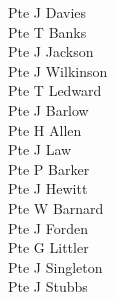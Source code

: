 \begin{multicols}{3}
  Pte J Davies \\
  Pte T Banks \\
  Pte J Jackson \\
  Pte J Wilkinson \\
  Pte T Ledward \\
  Pte J Barlow \\
  Pte H Allen \\
  Pte J Law \\
  Pte P Barker \\
  Pte J Hewitt \\
  Pte W Barnard \\
  Pte J Forden \\
  Pte G Littler \\
  Pte J Singleton \\
  Pte J Stubbs \\
\end{multicols}
